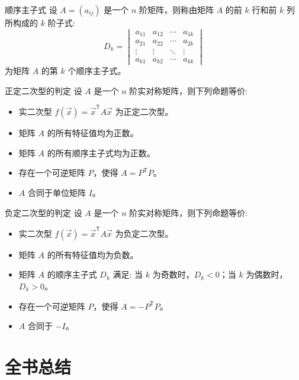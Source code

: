 \documentclass[a4paper,12pt]{ctexart}
\begin{document}
\begin{mydef}{顺序主子式}{}
    设 $A = (a_{ij})$ 是一个 $n$ 阶矩阵，则称由矩阵 $A$ 的前 $k$ 行和前 $k$ 列所构成的 $k$ 阶子式:
    \[
    D_k = \begin{vmatrix}
    a_{11} & a_{12} & \cdots & a_{1k} \\
    a_{21} & a_{22} & \cdots & a_{2k} \\
    \vdots & \vdots & \ddots & \vdots \\
    a_{k1} & a_{k2} & \cdots & a_{kk}
    \end{vmatrix}
    \]
    为矩阵 $A$ 的第 $k$ 个顺序主子式。
\end{mydef}

\begin{mythm}{正定二次型的判定}{}
    设 $A$ 是一个 $n$ 阶实对称矩阵，则下列命题等价:
    \begin{itemize}
        \item 实二次型 $f(\vec{x}) = \vec{x}^{\mathsf{T}} A \vec{x}$ 为正定二次型。
        \item 矩阵 $A$ 的所有特征值均为正数。
        \item 矩阵 $A$ 的所有顺序主子式均为正数。
        \item 存在一个可逆矩阵 $P$，使得 $A = P^{\mathsf{T}} P$。
        \item $A$ 合同于单位矩阵 $I$。
    \end{itemize}
\end{mythm}

\begin{mythm}{负定二次型的判定}{}
    设 $A$ 是一个 $n$ 阶实对称矩阵，则下列命题等价:
    \begin{itemize}
        \item 实二次型 $f(\vec{x}) = \vec{x}^{\mathsf{T}} A \vec{x}$ 为负定二次型。
        \item 矩阵 $A$ 的所有特征值均为负数。
        \item 矩阵 $A$ 的顺序主子式 $D_k$ 满足: 当 $k$ 为奇数时，$D_k < 0$；当 $k$ 为偶数时，$D_k > 0$。
        \item 存在一个可逆矩阵 $P$，使得 $A = - P^{\mathsf{T}} P$。
        \item $A$ 合同于 $-I$。
    \end{itemize}
\end{mythm}

\newpage

\section{全书总结}
\end{document}

